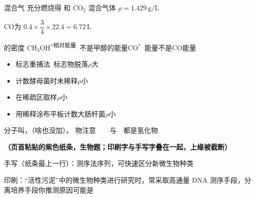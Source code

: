 混合气 充分燃烧得  和 $\mathrm{CO_2}$ 混合气体 $\rho=1.429\,\mathrm{g/L}$

$\mathrm{CO}$为 $0.4\times\dfrac{3}{4}\times22.4=6.72\,\mathrm{L}$

的密度 %
CH$_3$OH$^{*}$\textsuperscript{相对能量}\ 不是甲醇的能量\qquad CO$^{*}$\ 能量不是CO能量
\begin{itemize}
\item 标志重捕法\ 标志物脱落\quad $\rho$大
\item 计数酵母菌时未稀释\quad $\rho$小
\item 在稀疏区取样\quad $\rho$小
\item 用稀释涂布平板计数大肠杆菌\quad $\rho$小
\end{itemize}
分子叫，（啥也没加）。
物注意\ \ \ \ 与\ \ 都是氢化物

\textbf{（页首粘贴的紫色纸条，生物题；印刷字与手写字叠在一起，上缘被截断）}

手写（纸条最上一行）：测序法序列，可快速区分新微生物种类

印刷：“活性污泥”中的微生物种类进行研究时，常采取高通量 DNA 测序手段，分离培养手段你推测原因可能是

